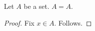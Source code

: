 \begin{proposition}\label{invalid_fix_shape}
    Let $A$ be a set.
    $A=A$.
\end{proposition}
\begin{proof}
    Fix $x\in A$.
    Follows.
\end{proof}
